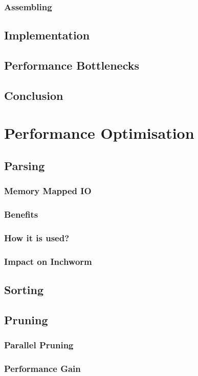 \documentclass[plainarticle,zihtitle,english,final,hyperref,utf8]{zihpub}
\begin{document}
\subsubsection{Assembling}
\subsection{Implementation}
\subsection{Performance Bottlenecks}
\subsection{Conclusion}

\section{Performance Optimisation}
\subsection{Parsing}
\subsubsection{Memory Mapped IO}
\subsubsection{Benefits}
\subsubsection{How it is used?}
\subsubsection{Impact on Inchworm}
\subsection{Sorting}
\subsection{Pruning}
\subsubsection{Parallel Pruning}
\subsubsection{Performance Gain}
\end{document}
